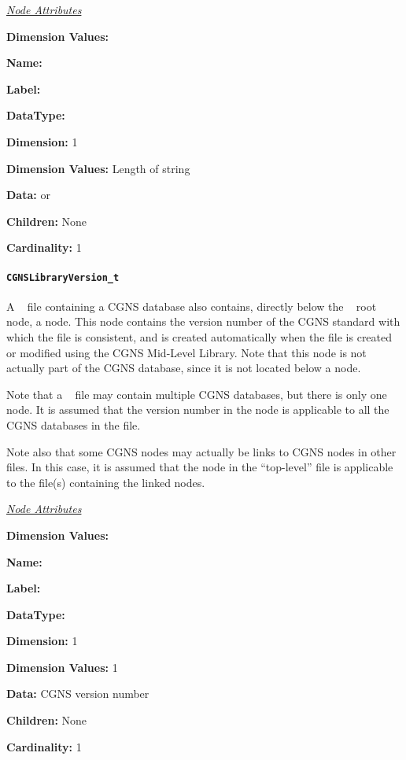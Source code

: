 \textit{\uline{Node Attributes}}
\begin{Ventryic}{\textbf{Dimension Values:}}
\item [\textbf{Name:}]
\item [\textbf{Label:}]
\item [\textbf{DataType:}]
\item [\textbf{Dimension:}]
      1
\item [\textbf{Dimension Values:}]
      Length of string
\item [\textbf{Data:}]
       or 
\item [\textbf{Children:}]
      None
\item [\textbf{Cardinality:}]
      1
\end{Ventryic}

\paragraph{\texttt{CGNSLibraryVersion\_t}}

A \SLL~ file containing a CGNS database also contains, directly below the
\SLL~ root node, a  node.
This node contains the version number of the CGNS standard with which
the file is consistent, and is created automatically when the file is
created or modified using the CGNS Mid-Level Library.
Note that this node is not actually part of the CGNS database, since
it is not located below a  node.

Note that a \SLL~ file may contain multiple CGNS databases, but there is
only one  node.
It is assumed that the version number in the 
node is applicable to all the CGNS databases in the file.

Note also that some CGNS nodes may actually be links to CGNS nodes in
other files.
In this case, it is assumed that the  node
in the ``top-level'' file is applicable to the file(s) containing the
linked nodes.

\textit{\uline{Node Attributes}}
\begin{Ventryic}{\textbf{Dimension Values:}}
\item [\textbf{Name:}]
\item [\textbf{Label:}]
\item [\textbf{DataType:}]
\item [\textbf{Dimension:}]
      1
\item [\textbf{Dimension Values:}]
      1
\item [\textbf{Data:}]
      CGNS version number
\item [\textbf{Children:}]
      None
\item [\textbf{Cardinality:}]
      1
\end{Ventryic}
